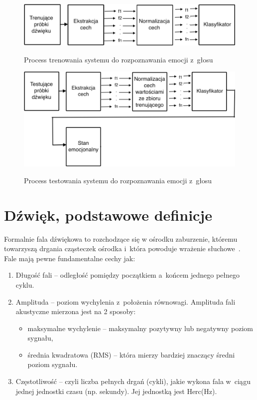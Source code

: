 \documentclass[declaration,shortabstract]{iithesis}
\begin{document}
\begin{figure}[!htb]
\hspace*{-6cm}
	\caption{Process trenowania systemu do rozpoznawania emocji z~głosu}
	\includegraphics[scale=0.40]{trenowanie.png}
\label{ser_tren}
\end{figure}

\begin{figure}[!htb]
\hspace*{-6cm}  
	\caption{Process testowania systemu do rozpoznawania emocji z~głosu}
	\includegraphics[scale=0.35]{testowanie.png}
\label{ser_test}
\end{figure}

\section{Dźwięk, podstawowe definicje}
Formalnie fala dźwiękowa to rozchodzące się w ośrodku zaburzenie, któremu towarzyszą drgania cząsteczek ośrodka i~która powoduje wrażenie słuchowe~\cite{Akustyka}. Fale mają pewne fundamentalne cechy jak:
\begin{enumerate}
\item Długość fali -- odległość pomiędzy początkiem a~końcem jednego pełnego cyklu.
\item Amplituda -- poziom wychylenia z~położenia równowagi. Amplituda fali akustyczne mierzona jest na 2 sposoby:
	\begin{itemize}
	\item maksymalne wychylenie -- maksymalny pozytywny lub negatywny poziom sygnału,
	\item średnia kwadratowa (RMS) -- która mierzy bardziej znaczący średni poziom sygnału.
	\end{itemize}
\item Częstotliwość -- czyli liczba pełnych drgań (cykli), jakie wykona fala w~ciągu jednej jednostki czasu (np. sekundy). Jej jednostką jest Herc(Hz).
\end{enumerate}
\end{document}
